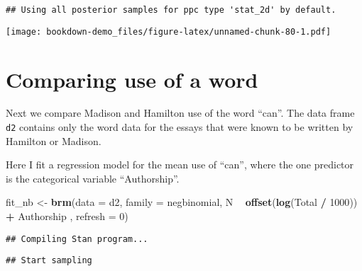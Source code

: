 \documentclass[
]{book}
\newenvironment{Shaded}{\begin{snugshade}}{\end{snugshade}}
\newcommand{\DataTypeTok}[1]{\textcolor[rgb]{0.13,0.29,0.53}{#1}}
\newcommand{\DecValTok}[1]{\textcolor[rgb]{0.00,0.00,0.81}{#1}}
\newcommand{\KeywordTok}[1]{\textcolor[rgb]{0.13,0.29,0.53}{\textbf{#1}}}
\newcommand{\NormalTok}[1]{#1}
\newcommand{\OperatorTok}[1]{\textcolor[rgb]{0.81,0.36,0.00}{\textbf{#1}}}
\newcommand{\StringTok}[1]{\textcolor[rgb]{0.31,0.60,0.02}{#1}}
\begin{document}
\begin{verbatim}
## Using all posterior samples for ppc type 'stat_2d' by default.
\end{verbatim}

\texttt{[image: bookdown-demo\_files/figure-latex/unnamed-chunk-80-1.pdf]}

\hypertarget{comparing-use-of-a-word}{%
\section{Comparing use of a word}\label{comparing-use-of-a-word}}

Next we compare Madison and Hamilton use of the word ``can''. The data frame \texttt{d2} contains only the word data for the essays that were known to be written by Hamilton or Madison.

\begin{Shaded}
\end{Shaded}

Here I fit a regression model for the mean use of ``can'', where the one predictor is the categorical variable ``Authorship''.

\begin{Shaded}
\begin{Highlighting}[]
\NormalTok{fit_nb <-}\StringTok{ }\KeywordTok{brm}\NormalTok{(}\DataTypeTok{data =}\NormalTok{ d2, }\DataTypeTok{family =}\NormalTok{ negbinomial,}
\NormalTok{           N }\OperatorTok{~}\StringTok{ }\KeywordTok{offset}\NormalTok{(}\KeywordTok{log}\NormalTok{(Total }\OperatorTok{/}\StringTok{ }\DecValTok{1000}\NormalTok{)) }\OperatorTok{+}\StringTok{ }
\StringTok{          }\NormalTok{Authorship ,}
           \DataTypeTok{refresh =} \DecValTok{0}\NormalTok{)}
\end{Highlighting}
\end{Shaded}

\begin{verbatim}
## Compiling Stan program...
\end{verbatim}

\begin{verbatim}
## Start sampling
\end{verbatim}
\end{document}
